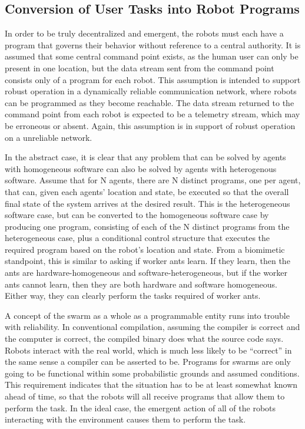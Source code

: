 \documentclass[]{article}
\begin{document}
\subsection{Conversion of User Tasks into Robot Programs} 

In order to be truly decentralized and emergent, the robots must each have a program that governs their behavior without reference to a central authority. 
It is assumed that some central command point exists, as the human user can only be present in one location, but the data stream sent from the command point consists only of a program for each robot. 
This assumption is intended to support robust operation in a dynamically reliable communication network, where robots can be programmed as they become reachable. 
The data stream returned to the command point from each robot is expected to be a telemetry stream, which may be erroneous or absent. 
Again, this assumption is in support of robust operation on a unreliable network. 

In the abstract case, it is clear that any problem that can be solved by agents with homogeneous software can also be solved by agents with heterogenous software. 
Assume that for N agents, there are N distinct programs, one per agent, that can, given each agents' location and state, be executed so that the overall final state of the system arrives at the desired result. 
This is the heterogeneous software case, but can be converted to the homogeneous software case by producing one program, consisting of each of the N distinct programs from the heterogeneous case, plus a conditional control structure that executes the required program based on the robot's location and state.  
From a biomimetic standpoint, this is similar to asking if worker ants learn. 
If they learn, then the ants are hardware-homogeneous and software-heterogeneous, but if the worker ants cannot learn, then they are both hardware and software homogeneous. Either way, they can clearly perform the tasks required of worker ants. 

A concept of the swarm as a whole as a programmable entity runs into trouble with reliability. 
In conventional compilation, assuming the compiler is correct and the computer is correct, the compiled binary does what the source code says. 
Robots interact with the real world, which is much less likely to be ``correct'' in the same sense a compiler can be asserted to be. 
Programs for swarms are only going to be functional within some probabilistic grounds and assumed conditions. 
This requirement indicates that the situation has to be at least somewhat known ahead of time, so that the robots will all receive programs that allow them to perform the task.
In the ideal case, the emergent action of all of the robots interacting with the environment causes them to perform the task. 
\end{document}
